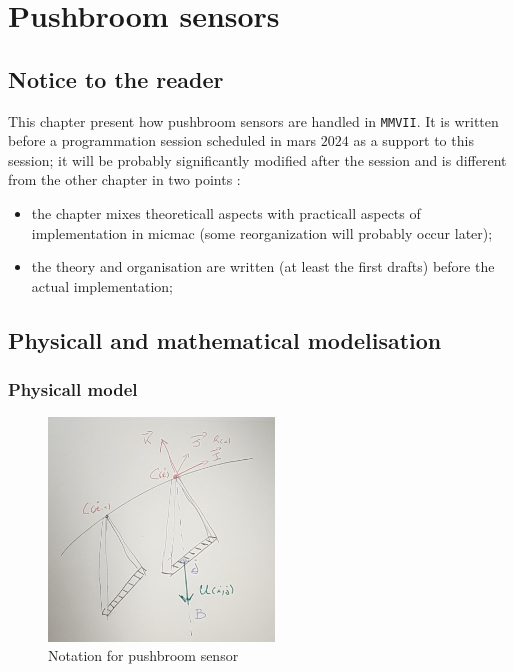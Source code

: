 \chapter{Pushbroom sensors}
\label{Chap:PushBroom}




\section{Notice to the reader}

This chapter present how pushbroom sensors are handled in {\tt MMVII}.
It is written before a programmation session scheduled in mars $2024$
as a support to this session;
it will be probably significantly modified after the session and is different
from the other chapter in two points :

\begin{itemize}
	\item  the  chapter mixes theoreticall aspects with practicall aspects
		of implementation in micmac (some reorganization will probably occur later);
	\item  the theory and organisation are written (at least the first drafts)
               before the actual implementation;
\end{itemize}



\section{Physicall and mathematical modelisation}

\subsection{Physicall model}

\begin{figure}
\centering
\includegraphics[width=6cm]{Methods/Images/PushB1.jpg}\caption{Notation for pushbroom sensor}
        \label{fig:PushB1}
\end{figure}


